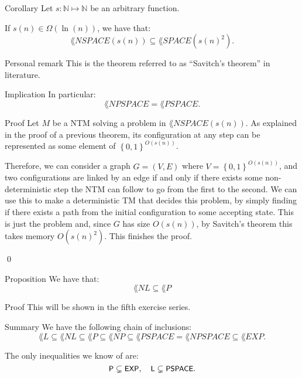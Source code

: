 \documentclass[a4paper]{article}
\begin{document}
\begin{parag}{Corollary}
    Let $s: \mathbb{N} \mapsto \mathbb{N}$ be an arbitrary function.

    If $s\left(n\right) \in \Omega\left(\ln\left(n\right)\right)$, we have that:
    \[\lang{NSPACE}\left(s\left(n\right)\right) \subseteq \lang{SPACE}\left(s\left(n\right)^2\right).\]
    
    \begin{subparag}{Personal remark}
        This is the theorem referred to as ``Savitch's theorem'' in literature. 
    \end{subparag}

    \begin{subparag}{Implication}
        In particular: 
        \[\lang{NPSPACE} = \lang{PSPACE}.\]
    \end{subparag}

    \begin{subparag}{Proof}
        Let $M$ be a NTM solving a problem in $\lang{NSPACE}\left(s\left(n\right)\right)$. As explained in the proof of a previous theorem, its configuration at any step can be represented as some element of $\left\{0, 1\right\}^{O\left(s\left(n\right)\right)}$.

        Therefore, we can consider a graph $G = \left(V, E\right)$ where $V = \left\{0, 1\right\}^{O\left(s\left(n\right)\right)}$, and two configurations are linked by an edge if and only if there exists some non-deterministic step the NTM can follow to go from the first to the second. We can use this to make a deterministic TM that decides this problem, by simply finding if there exists a path from the initial configuration to some accepting state. This is just the problem  and, since $G$ has size $O\left(s\left(n\right)\right)$, by Savitch's theorem this takes memory $O\left(s\left(n\right)^2\right)$. This finishes the proof.

        \qed
    \end{subparag}
\end{parag}

\begin{parag}{Proposition}
    We have that: 
    \[\lang{NL} \subseteq \lang{P}\]
    
    \begin{subparag}{Proof}
        This will be shown in the fifth exercise series.
    \end{subparag}
\end{parag}

\begin{parag}{Summary}
    We have the following chain of inclusions: 
    \[\lang{L} \subseteq \lang{NL} \subseteq \lang{P} \subseteq \lang{NP} \subseteq \lang{PSPACE} = \lang{NPSPACE} \subseteq \lang{EXP}.\]

    The only inequalities we know of are: 
    \[\lang{P} \subsetneq \lang{EXP}, \mathspace \lang{L} \subsetneq \lang{PSPACE}.\]
\end{parag}
\end{document}
